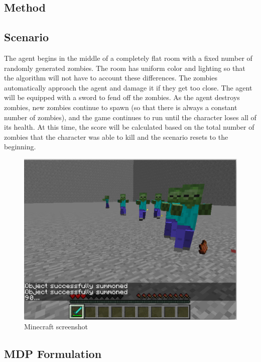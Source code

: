 \documentclass{article}
\begin{document}
\begin{multicols}{2}
\section{Method}



\subsection{Scenario}

The agent begins in the middle of a completely flat room with a fixed number of randomly generated zombies. The room has uniform color and lighting so that the algorithm will not have to account these differences. The zombies automatically approach the agent and damage it if they get too close. The agent will be equipped with a sword to fend off the zombies. As the agent destroys zombies, new zombies continue to spawn (so that there is always a constant number of zombies), and the game continues to run until the character loses all of its health. At this time, the score will be calculated based on the total number of zombies that the character was able to kill and the scenario resets to the beginning.

\begin{figure}[H]
\caption{Minecraft screenshot}
\centering
\includegraphics[scale=0.3]{./hiro_screenshot.png}
\end{figure}

\subsection{MDP Formulation}


\end{multicols}
\end{document}
